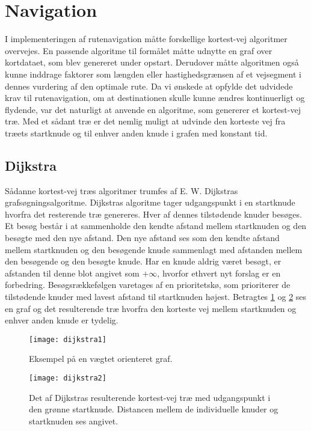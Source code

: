 \section{Navigation}
\label{sec:navigation}
I implementeringen af rutenavigation måtte forskellige kortest-vej algoritmer overvejes. En passende algoritme til formålet måtte udnytte en graf over kortdataet, som blev genereret under opstart. Derudover måtte algoritmen også kunne inddrage faktorer som længden eller hastighedsgrænsen af et vejsegment i dennes vurdering af den optimale rute. Da vi ønskede at opfylde det udvidede krav til rutenavigation, om at destinationen skulle kunne ændres kontinuerligt og flydende, var det naturligt at anvende en algoritme, som genererer et kortest-vej træ. Med et sådant træ er det nemlig muligt at udvinde den korteste vej fra træets startknude og til enhver anden knude i grafen med konstant tid.

\subsection{Dijkstra}
\label{subsec:dijkstra}
Sådanne kortest-vej træs algoritmer trumfes af E. W. Dijkstras grafsøgningsalgoritme. Dijkstras algoritme tager udgangspunkt i en startknude hvorfra det resterende træ genereres. Hver af dennes tilstødende knuder besøges. Et besøg består i at sammenholde den kendte afstand mellem startknuden og den besøgte med den nye afstand. Den nye afstand ses som den kendte afstand mellem startknuden og den besøgende knude sammenlagt med afstanden mellem den besøgende og den besøgte knude. Har en knude aldrig været besøgt, er afstanden til denne blot angivet som $+\infty$, hvorfor ethvert nyt forslag er en forbedring. Besøgsrækkefølgen varetages af en prioritetskø, som prioriterer de tilstødende knuder med lavest afstand til startknuden højest. Betragtes \ref{fig:dijkstra1} og \ref{fig:dijkstra2} ses en graf og det resulterende træ hvorfra den korteste vej mellem startknuden og enhver anden knude er tydelig.

\begin{figure}[h]
	\centering
  \texttt{[image: dijkstra1]}
  \captionsetup{width=0.8\textwidth}
  \caption{Eksempel på en vægtet orienteret graf.}
  \label{fig:dijkstra1}
\end{figure}

\begin{figure}[h]
	\centering
  \texttt{[image: dijkstra2]}
  \captionsetup{width=0.8\textwidth}
  \caption{Det af Dijkstras resulterende kortest-vej træ med udgangspunkt i den grønne startknude. Distancen mellem de individuelle knuder og startknuden ses angivet.}
  \label{fig:dijkstra2}
\end{figure}

